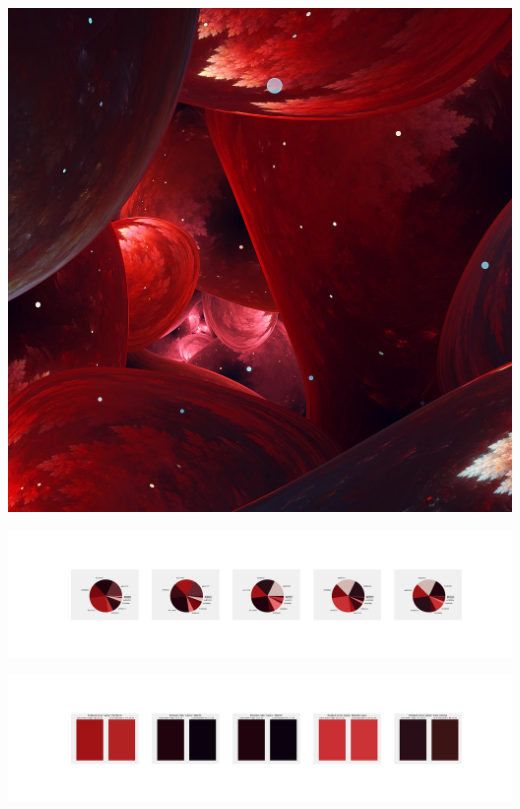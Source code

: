 \documentclass[11pt]{article}
\begin{document}
\begin{landscape}
    \begin{center}
    \includegraphics[width=\textwidth]{./nbimg/file (406).jpg}
    \end{center}

    \begin{center}
    \includegraphics[width=250mm]{./nbimg/pie-341.jpg}
    \end{center}

    \begin{center}
    \includegraphics[width=250mm]{./nbimg/peak-341.jpg}
    \end{center}
    


\end{landscape}
\end{document}
